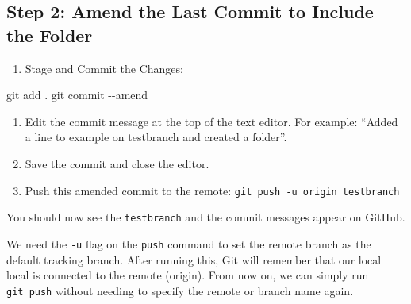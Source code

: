 \documentclass[
  11pt,
  letterpaper,
  DIV=11,
  numbers=noendperiod]{scrartcl}
\newenvironment{Shaded}{\begin{snugshade}}{\end{snugshade}}
\newcommand{\AttributeTok}[1]{\textcolor[rgb]{0.40,0.45,0.13}{#1}}
\newcommand{\FunctionTok}[1]{\textcolor[rgb]{0.28,0.35,0.67}{#1}}
\newcommand{\NormalTok}[1]{\textcolor[rgb]{0.00,0.23,0.31}{#1}}
\providecommand{\tightlist}{%
  \setlength{\itemsep}{0pt}\setlength{\parskip}{0pt}}\usepackage{longtable,booktabs,array}
\let\textttOrig\texttt
\renewcommand{\texttt}[1]{\textttOrig{\colorbox{codebggray}{\textcolor{codefontcolor}{#1}}}}
\begin{document}
\subsection{Step 2: Amend the Last Commit to Include the
Folder}\label{step-2-amend-the-last-commit-to-include-the-folder}

\begin{enumerate}
\def\labelenumi{\arabic{enumi}.}
\tightlist
\item
  Stage and Commit the Changes:
\end{enumerate}

\begin{Shaded}
\begin{Highlighting}[]
\FunctionTok{git}\NormalTok{ add .}
\FunctionTok{git}\NormalTok{ commit }\AttributeTok{{-}{-}amend}
\end{Highlighting}
\end{Shaded}

\begin{enumerate}
\def\labelenumi{\arabic{enumi}.}
\setcounter{enumi}{1}
\tightlist
\item
  Edit the commit message at the top of the text editor. For example:
  ``Added a line to example on testbranch and created a folder''.
\item
  Save the commit and close the editor.
\item
  Push this amended commit to the remote:
  \texttt{git\ push\ -u\ origin\ testbranch}
\end{enumerate}

You should now see the \texttt{testbranch} and the commit messages
appear on GitHub.

\begin{tcolorbox}[enhanced jigsaw, opacityback=0, coltitle=black, bottomrule=.15mm, opacitybacktitle=0.6, breakable, colbacktitle=quarto-callout-tip-color!10!white, title=\textcolor{quarto-callout-tip-color}{\faLightbulb}\hspace{0.5em}{Tip}, left=2mm, rightrule=.15mm, toprule=.15mm, leftrule=.75mm, bottomtitle=1mm, toptitle=1mm, colback=white, titlerule=0mm, arc=.35mm, colframe=quarto-callout-tip-color-frame]

We need the \texttt{-u} flag on the \texttt{push} command to set the
remote branch as the default tracking branch. After running this, Git
will remember that our local local is connected to the remote (origin).
From now on, we can simply run \texttt{git\ push} without needing to
specify the remote or branch name again.

\end{tcolorbox}
\end{document}
